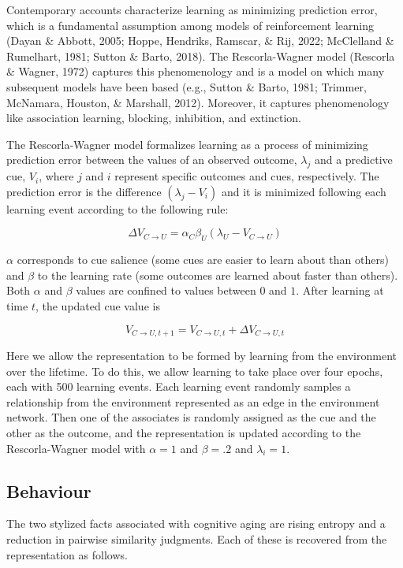 \documentclass[
  man]{apa6}
\begin{document}
Contemporary accounts characterize learning as minimizing prediction error, which is a fundamental assumption among models of reinforcement learning (Dayan \& Abbott, 2005; Hoppe, Hendriks, Ramscar, \& Rij, 2022; McClelland \& Rumelhart, 1981; Sutton \& Barto, 2018). The Rescorla-Wagner model (Rescorla \& Wagner, 1972) captures this phenomenology and is a model on which many subsequent models have been based (e.g., Sutton \& Barto, 1981; Trimmer, McNamara, Houston, \& Marshall, 2012). Moreover, it captures phenomenology like association learning, blocking, inhibition, and extinction.

The Rescorla-Wagner model formalizes learning as a process of minimizing prediction error between the values of an observed outcome, \(\lambda_j\) and a predictive cue, \(V_i\), where \(j\) and \(i\) represent specific outcomes and cues, respectively. The prediction error is the difference \((\lambda_j-V_i)\) and it is minimized following each learning event according to the following rule:

\[
\Delta V_{C \rightarrow U} = \alpha_C \beta_U (\lambda_{U} - V_{C \rightarrow U})
\]

\(\alpha\) corresponds to cue salience (some cues are easier to learn about than others) and \(\beta\) to the learning rate (some outcomes are learned about faster than others). Both \(\alpha\) and \(\beta\) values are confined to values between \(0\) and \(1\). After learning at time \(t\), the updated cue value is

\[
V_{C \rightarrow U, t+1} = V_{C \rightarrow U, t} + \Delta V_{C \rightarrow U, t}
\]

Here we allow the representation to be formed by learning from the environment over the lifetime. To do this, we allow learning to take place over four epochs, each with 500 learning events. Each learning event randomly samples a relationship from the environment represented as an edge in the environment network. Then one of the associates is randomly assigned as the cue and the other as the outcome, and the representation is updated according to the Rescorla-Wagner model with \(\alpha=1\) and \(\beta=.2\) and \(\lambda_i=1\).

\hypertarget{behaviour}{%
\subsection{Behaviour}\label{behaviour}}

The two stylized facts associated with cognitive aging are rising entropy and a reduction in pairwise similarity judgments. Each of these is recovered from the representation as follows.
\end{document}
